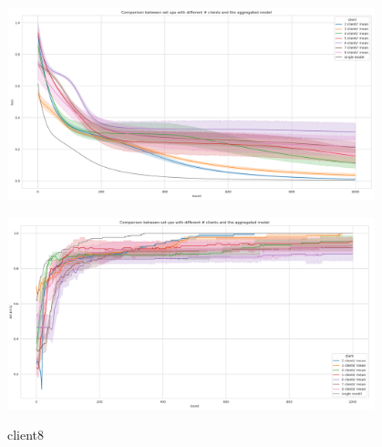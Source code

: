 \documentclass{article} %
\begin{document}
\begin{figure}[!ht]
    \centering
        \includegraphics[width=0.95\textwidth, keepaspectratio]{images/loss_red_same.png}
    \caption{}
    \label{fig3}
\end{figure}
\begin{figure}[!ht]
    \centering
        \includegraphics[width=0.95\textwidth, keepaspectratio]{images/accuracy_red_same.png}
    \caption{}
    \label{fig4}
\end{figure}
\begin{figure}[!ht]
    \centering
    \caption{client8}
    \label{fig5}
\end{figure}
\end{document}
